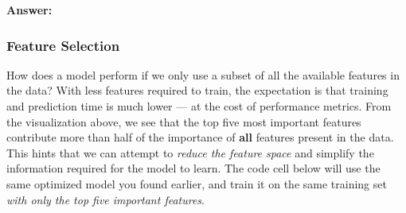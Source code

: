 \documentclass[11pt]{article}
\begin{document}
    \textbf{Answer:}

    \subsubsection{Feature Selection}\label{feature-selection}

How does a model perform if we only use a subset of all the available
features in the data? With less features required to train, the
expectation is that training and prediction time is much lower --- at
the cost of performance metrics. From the visualization above, we see
that the top five most important features contribute more than half of
the importance of \textbf{all} features present in the data. This hints
that we can attempt to \emph{reduce the feature space} and simplify the
information required for the model to learn. The code cell below will
use the same optimized model you found earlier, and train it on the same
training set \emph{with only the top five important features}.
\end{document}
